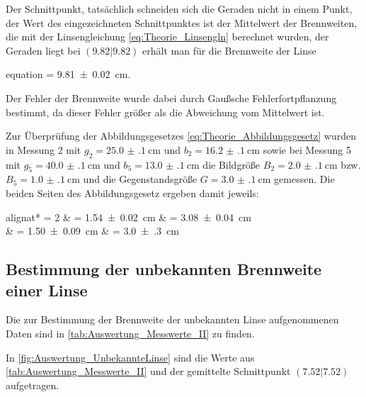 	 Der Schnittpunkt, tatsächlich schneiden sich die Geraden nicht in einem Punkt, der Wert
	 des eingezeichneten Schnittpunktes ist der Mittelwert der Brennweiten, die mit der Linsengleichung
	 \cref{eq:Theorie_Linsengln} berechnet
	 wurden, der Geraden liegt bei $(9.82|9.82)$ erhält man für die Brennweite der Linse
	 \begin{empheq}{equation}
		\label{val:Auswertung_Bekannt}
		 = \SI{9.81(2)}{\centi\meter}.
	 \end{empheq}
	 Der Fehler der Brennweite wurde dabei durch Gaußsche Fehlerfortpflanzung bestimmt, da dieser Fehler größer als
	 die Abweichung vom Mittelwert ist.	 
	 
	 Zur Überprüfung der Abbildungsgesetzes \cref{eq:Theorie_Abbildungsgesetz} wurden in 
	 Messung 2 mit $g_{2} = \SI{25.0(1)}{\cm}$ und $b_{2} = \SI{16.2(1)}{\cm}$ sowie
	 bei Messung 5 mit $g_{5} = \SI{40.0(1)}{\cm}$ und $b_{5} = \SI{13.0(1)}{\cm}$
	 die Bildgröße $B_{2} = \SI{2.0(1)}{\cm}$ bzw. $B_{5} = \SI{1.0(1)}{\cm}$ und 
	 die Gegenstandsgröße $G = \SI{3.0(1)}{\centi\meter}$ gemessen.
	 Die beiden Seiten des Abbildungsgesetz ergeben damit jeweils:
	 \begin{empheq}{alignat* = 2}
	 	& = \SI{1.54(2)}{\cm} \qquad	& = \SI{3.08(4)}{\cm}\\  
	 	& = \SI{1.50(9)}{\cm}	\qquad     & = \SI{3.0(3)}{\cm}
	 \end{empheq}
	 
	 
	  
\subsection{Bestimmung der unbekannten Brennweite einer Linse}
	
	Die zur Bestimmung der Brennweite der unbekannten Linse aufgenommenen Daten sind in 
	\cref{tab:Auswertung_Messwerte_II} zu finden.
	
	 
	
	In \cref{fig:Auswertung_UnbekannteLinse} sind die Werte aus \cref{tab:Auswertung_Messwerte_II} und der gemittelte Schnittpunkt
	$(7.52|7.52)$ aufgetragen.
	
